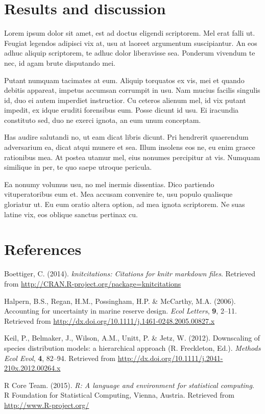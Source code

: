 \documentclass[]{article}
\begin{document}
\section{Results and discussion}\label{results-and-discussion}

Lorem ipsum dolor sit amet, est ad doctus eligendi scriptorem. Mel erat
falli ut. Feugiat legendos adipisci vix at, usu at laoreet argumentum
suscipiantur. An eos adhuc aliquip scriptorem, te adhuc dolor
liberavisse sea. Ponderum vivendum te nec, id agam brute disputando mei.

Putant numquam tacimates at eum. Aliquip torquatos ex vis, mei et quando
debitis appareat, impetus accumsan corrumpit in usu. Nam mucius facilis
singulis id, duo ei autem imperdiet instructior. Cu ceteros alienum mel,
id vix putant impedit, ex idque eruditi forensibus eum. Posse dicunt id
usu. Ei iracundia constituto sed, duo ne exerci ignota, an eum unum
conceptam.

Has audire salutandi no, ut eam dicat libris dicunt. Pri hendrerit
quaerendum adversarium ea, dicat atqui munere et sea. Illum insolens eos
ne, eu enim graece rationibus mea. At postea utamur mel, eius nonumes
percipitur at vis. Numquam similique in per, te quo saepe utroque
pericula.

Ea nonumy volumus usu, no mel inermis dissentias. Dico partiendo
vituperatoribus eum et. Mea accusam convenire te, usu populo qualisque
gloriatur ut. Eu eum oratio altera option, ad mea ignota scriptorem. Ne
suas latine vix, eos oblique sanctus pertinax cu.

\section*{References}\label{references}

Boettiger, C. (2014). \emph{knitcitations: Citations for knitr markdown
files}. Retrieved from
\url{http://CRAN.R-project.org/package=knitcitations}

Halpern, B.S., Regan, H.M., Possingham, H.P. \& McCarthy, M.A. (2006).
Accounting for uncertainty in marine reserve design. \emph{Ecol
Letters}, \textbf{9}, 2--11. Retrieved from
\url{http://dx.doi.org/10.1111/j.1461-0248.2005.00827.x}

Keil, P., Belmaker, J., Wilson, A.M., Unitt, P. \& Jetz, W. (2012).
Downscaling of species distribution models: a hierarchical approach (R.
Freckleton, Ed.). \emph{Methods Ecol Evol}, \textbf{4}, 82--94.
Retrieved from \url{http://dx.doi.org/10.1111/j.2041-210x.2012.00264.x}

R Core Team. (2015). \emph{R: A language and environment for statistical
computing}. R Foundation for Statistical Computing, Vienna, Austria.
Retrieved from \url{http://www.R-project.org/}
\end{document}
